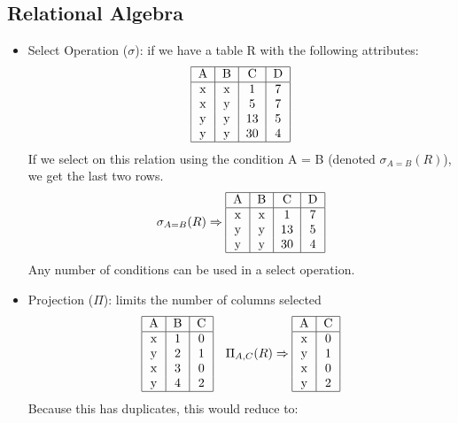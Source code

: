 \documentclass{math}
\begin{document}
\subsection*{Relational Algebra}
\begin{itemize}
  \item Select Operation (\( \sigma \)): if we have a table R with the
    following attributes:
    \[ \begin{tabular}{|c|c|c|c|}
      \hline
      A & B & C & D \\
      \hline
      x & x & 1 & 7 \\
      x & y & 5 & 7 \\
      y & y & 13 & 5 \\
      y & y & 30 & 4 \\
      \hline
    \end{tabular} \]
    If we select on this relation using the condition A = B (denoted
    \( \sigma_{A=B}(R) \)), we get the last two rows.
    \[ \sigma_{A=B}(R) \Rightarrow \begin{tabular}{|c|c|c|c|}
      \hline
      A & B & C & D \\
      \hline
      x & x & 1 & 7 \\
      y & y & 13 & 5 \\
      y & y & 30 & 4 \\
      \hline
    \end{tabular} \]
    Any number of conditions
    can be used in a select operation.
  \item Projection (\( \Pi \)): limits the number of columns selected
    \[ \begin{tabular}{|c|c|c|c|}
      \hline
      A & B & C \\
      \hline
      x & 1 & 0 \\
      y & 2 & 1 \\
      x & 3 & 0 \\
      y & 4 & 2 \\
      \hline
    \end{tabular} \quad\Pi_{A,C}(R) \Rightarrow
    \begin{tabular}{|c|c|c|c|}
      \hline
      A & C \\
      \hline
      x & 0 \\
      y & 1 \\
      x & 0 \\
      y & 2 \\
      \hline
    \end{tabular} \]
    Because this has duplicates, this would reduce to:

\end{itemize}
\end{document}
